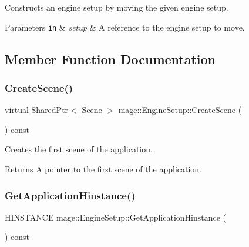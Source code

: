 Constructs an engine setup by moving the given engine setup.


\begin{DoxyParams}[1]{Parameters}
\mbox{\tt in}  & {\em setup} & A reference to the engine setup to move. \\
\hline
\end{DoxyParams}


\subsection{Member Function Documentation}
\hypertarget{structmage_1_1_engine_setup_a004fce6a741fc68c8f6feed546d9f220}{}\label{structmage_1_1_engine_setup_a004fce6a741fc68c8f6feed546d9f220} 
\subsubsection{\texorpdfstring{Create\+Scene()}{CreateScene()}}
{\footnotesize\ttfamily virtual \hyperlink{namespacemage_a1e01ae66713838a7a67d30e44c67703e}{Shared\+Ptr}$<$ \hyperlink{classmage_1_1_scene}{Scene} $>$ mage\+::\+Engine\+Setup\+::\+Create\+Scene (\begin{DoxyParamCaption}{ }\end{DoxyParamCaption}) const\hspace{0.3cm}{\ttfamily [pure virtual]}}

Creates the first scene of the application.

\begin{DoxyReturn}{Returns}
A pointer to the first scene of the application. 
\end{DoxyReturn}
\hypertarget{structmage_1_1_engine_setup_a2d9220896adfe924ac72165b4e2b13cf}{}\label{structmage_1_1_engine_setup_a2d9220896adfe924ac72165b4e2b13cf} 
\subsubsection{\texorpdfstring{Get\+Application\+Hinstance()}{GetApplicationHinstance()}}
{\footnotesize\ttfamily H\+I\+N\+S\+T\+A\+N\+CE mage\+::\+Engine\+Setup\+::\+Get\+Application\+Hinstance (\begin{DoxyParamCaption}{ }\end{DoxyParamCaption}) const}

